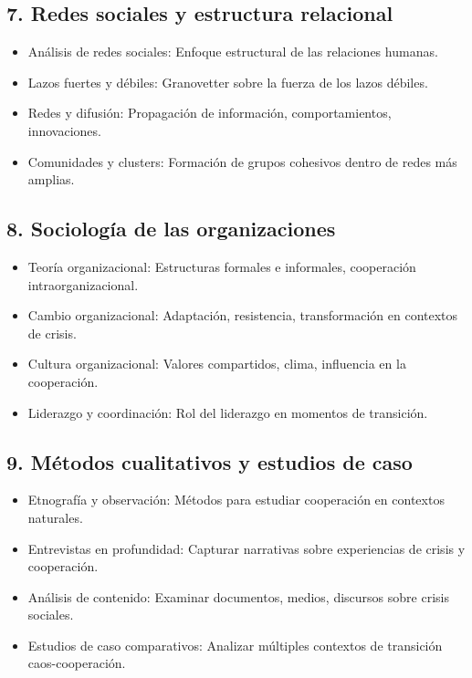 \documentclass[a4paper,11pt]{article}
\begin{document}
\subsection*{7. Redes sociales y estructura relacional}
\begin{itemize}[leftmargin=*, label=--]
    \item Análisis de redes sociales: Enfoque estructural de las relaciones humanas.
    \item Lazos fuertes y débiles: Granovetter sobre la fuerza de los lazos débiles.
    \item Redes y difusión: Propagación de información, comportamientos, innovaciones.
    \item Comunidades y clusters: Formación de grupos cohesivos dentro de redes más amplias.
\end{itemize}

\subsection*{8. Sociología de las organizaciones}
\begin{itemize}[leftmargin=*, label=--]
    \item Teoría organizacional: Estructuras formales e informales, cooperación intraorganizacional.
    \item Cambio organizacional: Adaptación, resistencia, transformación en contextos de crisis.
    \item Cultura organizacional: Valores compartidos, clima, influencia en la cooperación.
    \item Liderazgo y coordinación: Rol del liderazgo en momentos de transición.
\end{itemize}

\subsection*{9. Métodos cualitativos y estudios de caso}
\begin{itemize}[leftmargin=*, label=--]
    \item Etnografía y observación: Métodos para estudiar cooperación en contextos naturales.
    \item Entrevistas en profundidad: Capturar narrativas sobre experiencias de crisis y cooperación.
    \item Análisis de contenido: Examinar documentos, medios, discursos sobre crisis sociales.
    \item Estudios de caso comparativos: Analizar múltiples contextos de transición caos-cooperación.
\end{itemize}
\end{document}
